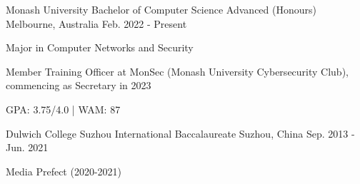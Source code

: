 

\begin{cventries}


    \cventry
    {Monash University}
    {Bachelor of Computer Science Advanced (Honours)}
    {Melbourne, Australia}
    {Feb. 2022 - Present}
    {
        \begin{cvitems}
            \item {Major in Computer Networks and Security}
            \item {Member Training Officer at MonSec (Monash University Cybersecurity Club), commencing as Secretary in 2023}
            \item {GPA: 3.75/4.0 | WAM: 87}
        \end{cvitems}
    }


  \cventry
    {Dulwich College Suzhou} %
    {International Baccalaureate} %
    {Suzhou, China} %
    {Sep. 2013 - Jun. 2021} %
    {
      \begin{cvitems} %
        \item {Media Prefect (2020-2021)}
      \end{cvitems}
    }

\end{cventries}
\vspace{-3.0mm}